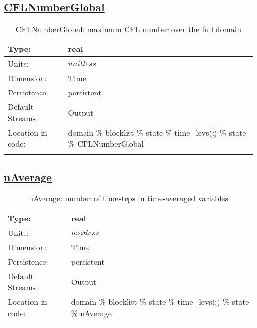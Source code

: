 \subsection[CFLNumberGlobal]{\hyperref[sec:var_tab_state]{CFLNumberGlobal}}
\label{subsec:var_sec_state_CFLNumberGlobal}
\begin{center}
\begin{longtable}{| p{2.0in} | p{4.0in} |}
        \hline 
        Type: & real \\
        \hline 
        Units: & $unitless$ \\
        \hline 
        Dimension: & Time \\
        \hline 
        Persistence: & persistent \\
        \hline 
		 Default Streams: & Output  \\
        \hline 
		 Location in code: & domain \% blocklist \% state \% time\_levs(:) \% state \% CFLNumberGlobal \\
		 \hline 
    \caption{CFLNumberGlobal: maximum CFL number over the full domain}
\end{longtable}
\end{center}
\subsection[nAverage]{\hyperref[sec:var_tab_state]{nAverage}}
\label{subsec:var_sec_state_nAverage}
\begin{center}
\begin{longtable}{| p{2.0in} | p{4.0in} |}
        \hline 
        Type: & real \\
        \hline 
        Units: & $unitless$ \\
        \hline 
        Dimension: & Time \\
        \hline 
        Persistence: & persistent \\
        \hline 
		 Default Streams: & Output  \\
        \hline 
		 Location in code: & domain \% blocklist \% state \% time\_levs(:) \% state \% nAverage \\
		 \hline 
    \caption{nAverage: number of timesteps in time-averaged variables}
\end{longtable}
\end{center}
